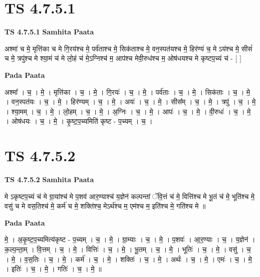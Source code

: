 \documentclass[17pt]{extarticle}
\begin{document}

\section{ TS 4.7.5.1 }

\textbf{TS 4.7.5.1 } \newline
\textbf{Samhita Paata} \newline

अश्मा॑ च मे॒ मृत्ति॑का च मे गि॒रय॑श्च मे॒ पर्व॑ताश्च मे॒ सिक॑ताश्च मे॒     वन॒स्पत॑यश्च मे॒ हिर॑ण्यं च॒ मे ऽय॑श्च मे॒ सीसं॑ च मे॒ त्रपु॑श्च मे    श्या॒मं च॑ मे लो॒हं च॑ मे॒ऽग्निश्च॑ म॒ आप॑श्च मेवी॒रुध॑श्च म॒ ओष॑धयश्च मे कृष्टप॒च्यं च॑ - [  ] \newline

\textbf{Pada Paata} \newline

अश्मा᳚ । च॒ । मे॒ । मृत्ति॑का । च॒ । मे॒ । गि॒रयः॑ । च॒ । मे॒ । पर्व॑ताः । च॒ । मे॒ । सिक॑ताः । च॒ । मे॒ । वन॒स्पत॑यः । च॒ । मे॒ । हिर॑ण्यम् । च॒ । मे॒ । अयः॑ । च॒ । मे॒ । सीस᳚म् । च॒ । मे॒ । त्रपु॑ । च॒ । मे॒ । श्या॒मम् । च॒ । मे॒ । लो॒हम् । च॒ । मे॒ । अ॒ग्निः । च॒ । मे॒ । आपः॑ । च॒ । मे॒ । वी॒रुधः॑ । च॒ । मे॒ । ओष॑धयः । च॒ । मे॒ । कृ॒ष्ट॒प॒च्यमिति॑ कृष्ट - प॒च्यम् । च॒ ।  \newline





\section{ TS 4.7.5.2 }

\textbf{TS 4.7.5.2 } \newline
\textbf{Samhita Paata} \newline

मे ऽकृष्टप॒च्यं च॑ मे ग्रा॒यांश्च॑ मे प॒शव॑ आर॒ण्याश्च॑ य॒ज्ञेन॑ कल्पन्तां ॅवि॒त्तं च॑ मे॒ वित्ति॑श्च मे भू॒तं च॑ मे॒ भूति॑श्च मे॒ वसु॑ च मे वस॒तिश्च॑ मे॒ कर्म॑ च मे॒ शक्ति॑श्च॒ मेऽर्थ॑श्च म॒ एम॑श्च म॒ इति॑श्च मे॒ गति॑श्च मे ॥ \newline

\textbf{Pada Paata} \newline

मे॒ । अ॒कृ॒ष्ट॒प॒च्यमित्य॑कृष्ट - प॒च्यम् । च॒ । मे॒ । ग्रा॒म्याः । च॒ । मे॒ । प॒शवः॑ । आ॒र॒ण्याः । च॒ । य॒ज्ञेन॑ । क॒ल्प॒न्ता॒म् । वि॒त्तम् । च॒ । मे॒ । वित्तिः॑ । च॒ । मे॒ । भू॒तम् । च॒ । मे॒ । भूतिः॑ । च॒ । मे॒ । वसु॑ । च॒ । मे॒ । व॒स॒तिः । च॒ । मे॒ । कर्म॑ । च॒ । मे॒ । शक्तिः॑ । च॒ । मे॒ । अर्थः॑ । च॒ । मे॒ । एमः॑ । च॒ । मे॒ । इतिः॑ । च॒ । मे॒ । गतिः॑ । च॒ । मे॒ ॥  \newline
\end{document}
